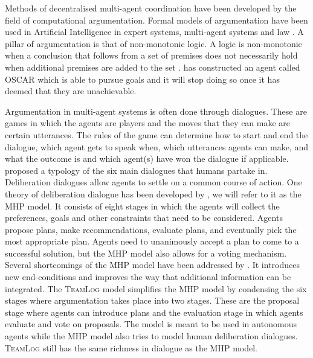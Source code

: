 Methods of decentralised multi-agent coordination have been developed by the 
field of
computational argumentation. Formal models of argumentation have been used in
Artificial Intelligence in expert systems, multi-agent systems and law
\citep{vaneemeren2014}. A pillar of argumentation is that of non-monotonic 
logic. A logic is non-monotonic when a conclusion that follows from a set of 
premises does not necessarily hold when additional premises are 
added to the set \citep{modgil2013,vaneemeren2014}. \cite{pollock1995} has 
constructed an agent called OSCAR which is able to pursue goals and it will 
stop doing so once it has deemed that they are unachievable. 

Argumentation in multi-agent systems is often done through dialogues. These are 
games in which the agents are players and the moves that they can make are 
certain utterances. The rules of the game can determine how to start 
and end the dialogue, which agent gets to speak when, which utterances agents 
can make, and what the outcome is and which agent(s) have won the dialogue if 
applicable. \cite{walton1995} proposed a typology of the six main dialogues 
that humans partake in. Deliberation dialogues allow agents to settle on a 
common course of action. One theory of deliberation dialogue has been developed 
by \cite{mcburney2007}, we will refer to it as the MHP model. It 
consists of eight stages in which the agents will collect the preferences, 
goals and other constraints that need to be considered. Agents propose plans, 
make recommendations, evaluate plans, and eventually pick the most appropriate 
plan. Agents need to unanimously accept a plan to come to a successful 
solution, but the MHP model also allows for a voting mechanism. Several 
shortcomings of the MHP model have been addressed by \cite{walton2014}. It 
introduces new end-conditions and improves the way that additional information 
can be integrated. The \textsc{TeamLog} model \citep{dunin-keplicz2011} 
simplifies the MHP model by condensing the six stages where argumentation takes 
place into two stages. These are the proposal stage where agents can introduce 
plans and the evaluation stage in which agents evaluate and vote on proposals. 
The model is meant to be used in autonomous agents while the MHP model also 
tries to model human deliberation dialogues.
\textsc{TeamLog} still has the same richness in dialogue as the MHP model.

